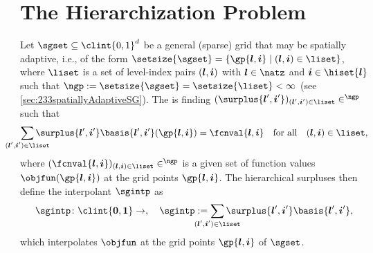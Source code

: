 \section{The Hierarchization Problem}
\label{sec:41problem}

Let $\sgset \subset \clint{0, 1}^d$ be a general (sparse) grid that
may be spatially adaptive, i.e.,
of the form $\setsize{\sgset} = \{\gp{\*l,\*i} \mid (\*l, \*i) \in \liset\}$,
where $\liset$ is a set of level-index pairs $({\boldsymbol{l}}, {\boldsymbol{i}})$ with $\*l \in \natz$
and $\*i \in \hiset{\*l}$ such that
$\ngp := \setsize{\sgset} = \setsize{\liset} < \infty$
(see \cref{sec:233spatiallyAdaptiveSG}).
The  is finding
$(\surplus{\*l',\*i'})_{(\*l',\*i') \in \liset} \in \real^{\ngp}$ such that
\begin{equation}
  \label{eq:hierarchizationProblem}
  \sum_{\mathclap{(\*l', \*i') \in \liset}} \surplus{\*l',\*i'}
  \basis{\*l',\*i'}(\gp{\*l,\*i}) = \fcnval{\*l,\*i}
  \quad\text{for all}\quad
  (\*l, \*i) \in \liset,
\end{equation}
where $(\fcnval{\*l,\*i})_{(\*l,\*i) \in \liset} \in \real^{\ngp}$ is a given set of
function values $\objfun(\gp{\*l,\*i})$ at the grid points $\gp{\*l,\*i}$.
The hierarchical surpluses then define the interpolant $\sgintp$ as
\begin{equation}
  \label{eq:hierarchizationInterpolant}
  \sgintp\colon \clint{\*0, \*1} \to \real,\quad
  \sgintp :=
  \sum_{\mathclap{(\*l', \*i') \in \liset}} \surplus{\*l',\*i'}
  \basis{\*l',\*i'},
\end{equation}
which interpolates $\objfun$ at the grid points $\gp{\*l,\*i}$ of $\sgset$.

